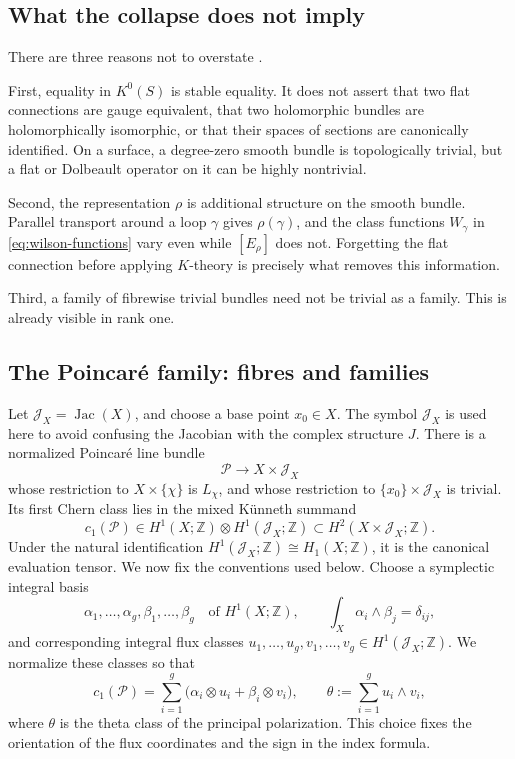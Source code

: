 \documentclass[11pt]{article}
\theoremstyle{definition}
\theoremstyle{remark}
\newcommand{\ZZ}{\mathbb Z}
\newcommand{\Jac}{\operatorname{Jac}}
\newcommand{\cP}{\mathcal P}
\begin{document}
\subsection{What the collapse does not imply}

There are three reasons not to overstate .

First, equality in \(K^0(S)\) is stable equality.  It does not assert that two
flat connections are gauge equivalent, that two holomorphic bundles are
holomorphically isomorphic, or that their spaces of sections are canonically
identified.  On a surface, a degree-zero smooth bundle is topologically
trivial, but a flat or Dolbeault operator on it can be highly nontrivial.

Second, the representation \(\rho\) is additional structure on the smooth
bundle.  Parallel transport around a loop \(\gamma\) gives
\(\rho(\gamma)\), and the class functions \(W_\gamma\) in
\eqref{eq:wilson-functions} vary even while \([E_\rho]\) does not.  Forgetting
the flat connection before applying \(K\)-theory is precisely what removes
this information.

Third, a family of fibrewise trivial bundles need not be trivial as a family.
This is already visible in rank one.

\subsection{The Poincar\'e family: fibres and families}

Let \(\mathcal J_X=\Jac(X)\), and choose a base point \(x_0\in X\).  The
symbol \(\mathcal J_X\) is used here to avoid confusing the Jacobian with the
complex structure \(J\).  There is a normalized Poincar\'e line bundle
\[
                   \cP\longrightarrow X\times\mathcal J_X
\]
whose restriction to \(X\times\{\chi\}\) is \(L_\chi\), and whose restriction
to \(\{x_0\}\times\mathcal J_X\) is trivial.  Its first Chern class lies in
the mixed
K\"unneth summand
\[
 c_1(\cP)\in H^1(X;\ZZ)\otimes H^1(\mathcal J_X;\ZZ)
          \subset H^2(X\times\mathcal J_X;\ZZ).
 \tag{3.5}\label{eq:poincare-c1-space}
\]
Under the natural identification
\(H^1(\mathcal J_X;\ZZ)\cong H_1(X;\ZZ)\), it is the canonical evaluation
tensor.  We now fix the conventions used below.  Choose a symplectic
integral basis
\[
 \alpha_1,\ldots,\alpha_g,\beta_1,\ldots,\beta_g
       \quad\text{of }H^1(X;\ZZ),
 \qquad
 \int_X\alpha_i\wedge\beta_j=\delta_{ij},
\]
and corresponding integral flux classes
\(u_1,\ldots,u_g,v_1,\ldots,v_g\in H^1(\mathcal J_X;\ZZ)\).
We normalize these classes so that
\[
 c_1(\cP)
   =\sum_{i=1}^g
       \bigl(\alpha_i\otimes u_i+\beta_i\otimes v_i\bigr),
 \qquad
 \theta:=\sum_{i=1}^g u_i\wedge v_i,
 \tag{3.6}\label{eq:poincare-c1}
\]
where \(\theta\) is the theta class of the principal polarization.  This
choice fixes the orientation of the flux coordinates and the sign in the
index formula.
\end{document}
